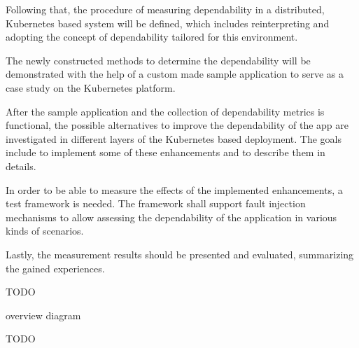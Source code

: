 Following that, the procedure of measuring dependability in a distributed, Kubernetes based system will be defined, which includes reinterpreting and adopting the concept of dependability tailored for this environment.

The newly constructed methods to determine the dependability will be demonstrated with the help of a custom made sample application to serve as a case study on the Kubernetes platform.

After the sample application and the collection of dependability metrics is functional, the possible alternatives to improve the dependability of the app are investigated in different layers of the Kubernetes based deployment. The goals include to implement some of these enhancements and to describe them in details.

In order to be able to measure the effects of the implemented enhancements, a test framework is needed. The framework shall support fault injection mechanisms to allow assessing the dependability of the application in various kinds of scenarios.

Lastly, the measurement results should be presented and evaluated, summarizing the gained experiences.



TODO

overview diagram

TODO

